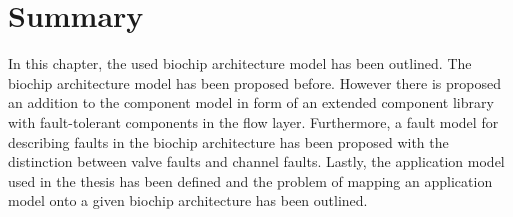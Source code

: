 

\section{Summary}
In this chapter, the used biochip architecture model has been outlined. The biochip architecture model has been proposed before. However there is proposed an addition to the component model in form of an extended component library with fault-tolerant components in the flow layer. Furthermore, a fault model for describing faults in the biochip architecture has been proposed with the distinction between valve faults and channel faults. Lastly, the application model used in the thesis has been defined and the problem of mapping an application model onto a given biochip architecture has been outlined.
